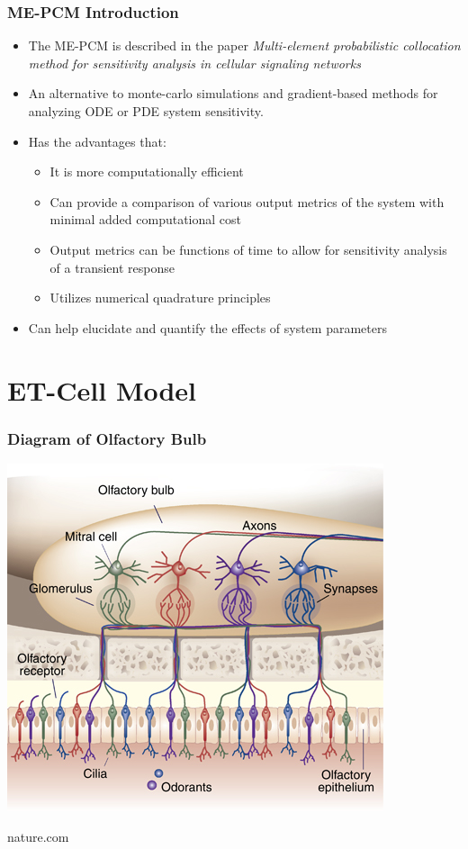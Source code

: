 \documentclass{beamer}
\theoremstyle{plain}
\theoremstyle{definition}
\begin{document}
\begin{frame}\frametitle{ME-PCM Introduction}
\begin{itemize}
  \item The ME-PCM is described in the paper \emph{Multi-element probabilistic collocation method for sensitivity analysis in cellular signaling networks} \cite{foo_multi-element_2009}
  \item An alternative to monte-carlo simulations and gradient-based methods for analyzing ODE or PDE system sensitivity.
  \item Has the advantages that:
    \begin{itemize}
     \item It is more computationally efficient
     \item Can provide a comparison of various output metrics of the system with minimal added computational cost
     \item Output metrics can be functions of time to allow for sensitivity analysis of a transient response
     \item Utilizes numerical quadrature principles
    \end{itemize}
  \item Can help elucidate and quantify the effects of system parameters
\end{itemize}
\end{frame}

\section{ET-Cell Model}

\begin{frame}\frametitle{Diagram of Olfactory Bulb}
  \begin{center}
   \includegraphics[scale = .8]{glomerularLayer.jpg}
  \end{center}
  nature.com
\end{frame}
\end{document}
